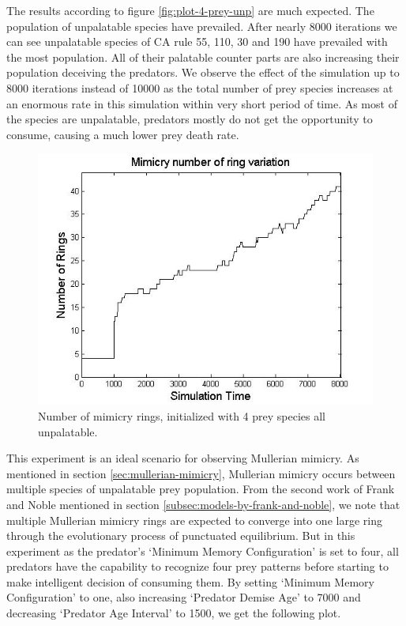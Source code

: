 The results according to figure \ref{fig:plot-4-prey-unp} are much expected. The population of unpalatable species have prevailed. After nearly 8000 iterations we can see unpalatable species of CA rule 55, 110, 30 and 190 have prevailed with the most population. All of their palatable counter parts are also increasing their population deceiving the predators. We observe the effect of the simulation up to 8000 iterations instead of 10000 as the total number of prey species increases at an enormous rate in this simulation within very short period of time. As most of the species are unpalatable, predators mostly do not get the opportunity to consume, causing a much lower prey death rate. 

\begin{figure}[H]
	\centering
	\includegraphics[scale=0.50]{images/ringSize8k-4Prey-unp}
	\caption[Number of mimicry rings (4 prey species all unpalatable)]{Number of mimicry rings, initialized with 4 prey species all unpalatable.}
	\label{fig:ringSize10k-4-Prey-unp}
\end{figure}

This experiment is an ideal scenario for observing Mullerian mimicry. As mentioned in section \ref{sec:mullerian-mimicry}, Mullerian mimicry occurs between multiple species of unpalatable prey population. From the second work of Frank and Noble \cite{franks2003} mentioned in section \ref{subsec:models-by-frank-and-noble}, we note that multiple Mullerian mimicry rings are expected to converge into one large ring through the evolutionary process of punctuated equilibrium. But in this experiment as the predator's `Minimum Memory Configuration' is set to four, all predators have the capability to recognize four prey patterns before starting to make intelligent decision of consuming them. By setting `Minimum Memory Configuration' to one, also increasing `Predator Demise Age' to 7000 and decreasing `Predator Age Interval' to 1500, we get the following plot. 

